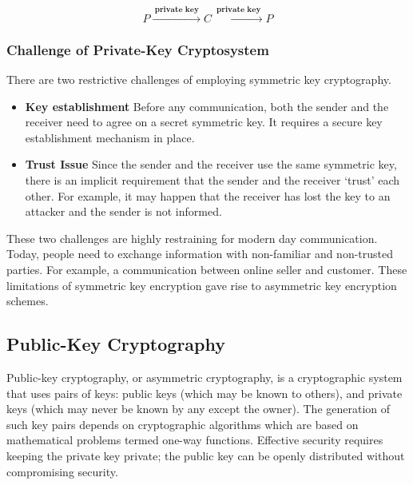 \documentclass[british]{article}
\begin{document}
$$ P\xrightarrow{\:\textbf{private key}\:}C\xrightarrow{\:\textbf{private key}\:}P $$

\medskip{}


\subsubsection{Challenge of Private-Key Cryptosystem}

There are two restrictive challenges of employing symmetric key cryptography.
\begin{itemize}
\item \textbf{Key establishment \textminus{}} Before any communication,
both the sender and the receiver need to agree on a secret symmetric
key. It requires a secure key establishment mechanism in place.
\item \textbf{Trust Issue \textminus{}} Since the sender and the receiver
use the same symmetric key, there is an implicit requirement that
the sender and the receiver \textquoteleft trust\textquoteright{}
each other. For example, it may happen that the receiver has lost
the key to an attacker and the sender is not informed.
\end{itemize}
These two challenges are highly restraining for modern day communication.
Today, people need to exchange information with non-familiar and non-trusted
parties. For example, a communication between online seller and customer.
These limitations of symmetric key encryption gave rise to asymmetric
key encryption schemes.

\subsection{Public-Key Cryptography}

Public-key cryptography, or asymmetric cryptography, is a cryptographic
system that uses pairs of keys: public keys (which may be known to
others), and private keys (which may never be known by any except
the owner). The generation of such key pairs depends on cryptographic
algorithms which are based on mathematical problems termed one-way
functions. Effective security requires keeping the private key private;
the public key can be openly distributed without compromising security.
\end{document}
